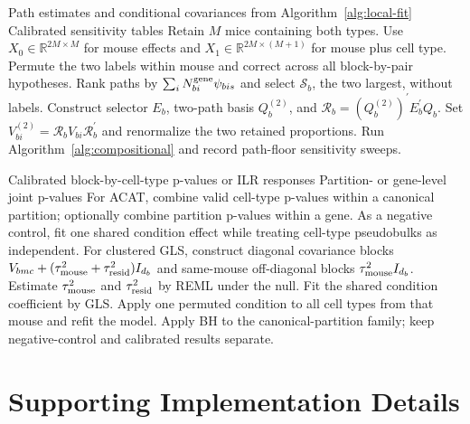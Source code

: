 \documentclass[11pt]{article}
\begin{document}
\begin{algorithm}[H]
\caption{Pairwise and dominant-path sensitivity tests}
\label{alg:sensitivities}
\begin{algorithmic}[1]
\Require Path estimates and conditional covariances from Algorithm~\ref{alg:local-fit}
\Ensure Calibrated sensitivity tables
  \State Retain \(M\) mice containing both types.
  \State Use \(X_0\in\mathbb R^{2M\times M}\) for mouse effects and \(X_1\in\mathbb R^{2M\times(M+1)}\) for mouse plus cell type.
  \State Permute the two labels within mouse and correct across all block-by-pair hypotheses.
\EndFor
{}
  \State Rank paths by \(\sum_iN_{bi}^{\rm gene}\psi_{bis}\) and select \(\mathcal S_b\), the two largest, without labels.
  \State Construct selector \(E_b\), two-path basis \(Q_b^{(2)}\), and \(\mathcal R_b=(Q_b^{(2)})^\prime E_b^\prime Q_b\).
  \State Set \(V_{bi}^{(2)}=\mathcal R_bV_{bi}\mathcal R_b^\prime\) and renormalize the two retained proportions.
  \State Run Algorithm~\ref{alg:compositional} and record path-floor sensitivity sweeps.
\EndFor
\end{algorithmic}
\end{algorithm}

\begin{algorithm}[H]
\caption{Joint condition tests}
\label{alg:joint}
\begin{algorithmic}[1]
\Require Calibrated block-by-cell-type p-values or ILR responses
\Ensure Partition- or gene-level joint p-values
\State For ACAT, combine valid cell-type p-values within a canonical partition; optionally combine partition p-values within a gene.
\State As a negative control, fit one shared condition effect while treating cell-type pseudobulks as independent.
\State For clustered GLS, construct diagonal covariance blocks \(V_{bmc}+(\tau_{\rm mouse}^2+\tau_{\rm resid}^2)I_{d_b}\) and same-mouse off-diagonal blocks \(\tau_{\rm mouse}^2I_{d_b}\).
\State Estimate \(\tau_{\rm mouse}^2\) and \(\tau_{\rm resid}^2\) by REML under the null.
\State Fit the shared condition coefficient by GLS.
  \State Apply one permuted condition to all cell types from that mouse and refit the model.
\EndFor
\State Apply BH to the canonical-partition family; keep negative-control and calibrated results separate.
\end{algorithmic}
\end{algorithm}

\section{Supporting Implementation Details}
\end{document}
